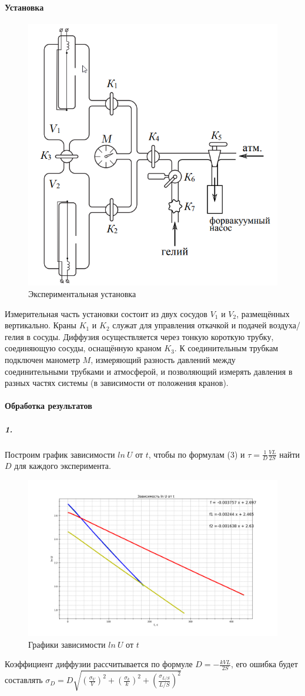 \documentclass[a4paper,12pt]{article}
\begin{document}
\paragraph{Установка\\}
\begin{figure}[!h]
\centering
\includegraphics[width=0.6\linewidth]{Установка.png}
\caption{Экспериментальная установка}
\label{fig:mpr}
\end{figure}
Измерительная часть установки состоит из двух сосудов $V_1$ и $V_2$, размещённых вертикально. Краны $K_1$ и $K_2$ служат для управления откачкой и
подачей воздуха/гелия в сосуды. Диффузия осуществляется через тонкую
короткую трубку, соединяющую сосуды, оснащённую краном $K_3$. К соединительным трубкам подключен манометр $M$, измеряющий разность давлений между соединительными трубками и атмосферой, и позволяющий
измерять давления в разных частях системы (в зависимости от положения
кранов).
\newpage
\paragraph{Обработка результатов\\}
\subparagraph{1.} Построим график зависимости $ln ~U$ от $t$, чтобы по формулам (3) и $\tau=\frac{1}{D}\frac{VL}{2S}$ найти $D$ для каждого эксперимента.
\begin{figure}[!h]
\centering
\includegraphics[width=0.8\linewidth]{U(t)1.png}
\caption{Графики зависимости $ln ~U$ от $t$}
\label{fig:mpr}
\end{figure}
Коэффициент диффузии рассчитывается по формуле $D = -\frac{kVL}{2S}$, его ошибка будет составлять $\sigma_D = D\sqrt{(\frac{\sigma_V}{V})^2+(\frac{\sigma_k}{k})^2+(\frac{\sigma_{L/S}}{L/S})^2}$
\end{document}
